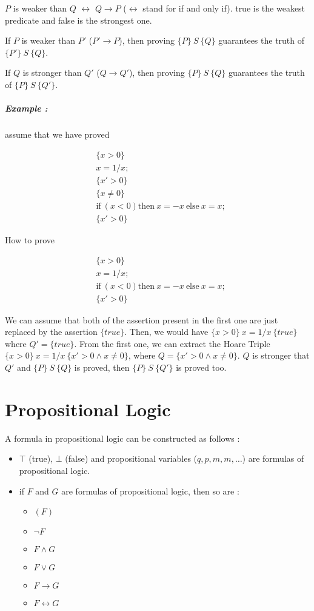 \documentclass[a4paper,11pt]{report}
\newcommand{\HTriple}[3]{\{#1\}\ #2 \ \{#3\}}
\begin{document}
$P$ is weaker than $Q$ $\leftrightarrow$ $Q \to P$ ($\leftrightarrow$ stand for
if and only if). true is the weakest predicate and false is the strongest one.

If $P$ is weaker than $P'$ ($P' \to P$), then proving $\HTriple{P}{S}{Q}$
guarantees the truth of $\HTriple{P'}{S}{Q}$.

If $Q$ is stronger than $Q'$ ($Q \to Q'$), then proving $\HTriple{P}{S}{Q}$
guarantees the truth of $\HTriple{P}{S}{Q'}$.

\paragraph{Example :} assume that we have proved

\begin{align*}
  & \{ x > 0 \} \\
  & x = 1/x; \\
  & \{ x' > 0 \} \\
  & \{ x \neq 0\} \\
  & \text{if}\ (x<0) \text{then}\ x = -x\ \text{else}\ x = x; \\
  & \{ x' > 0 \}
\end{align*}

How to prove

\begin{align*}
  & \{ x > 0 \} \\
  & x = 1/x; \\
  & \text{if}\ (x<0) \text{then}\ x = -x\ \text{else}\ x = x; \\
  & \{ x' > 0 \}
\end{align*}

We can assume that both of the assertion present in the first one are just
replaced by the assertion $\{true\}$. Then, we would have
$\HTriple{x>0}{x=1/x}{true}$ where $Q' = \{true\}$. From the first one, we can
extract the Hoare Triple $\HTriple{x>0}{x=1/x}{x'>0 \wedge x\neq 0}$, where $Q =
\{x'>0 \wedge x\neq 0\}$. $Q$ is stronger that $Q'$ and $\HTriple{P}{S}{Q}$ is
proved, then $\HTriple{P}{S}{Q'}$ is proved too.

\chapter{Propositional Logic}

A formula in propositional logic can be constructed as follows :
\begin{itemize}
\item $\top$ (true), $\bot$ (false) and propositional variables
  ($q,p,m,m,\dots$) are formulas of propositional logic.
\item if $F$ and $G$ are formulas of propositional logic, then so are :
  \begin{itemize}
  \item $(F)$
  \item $\neg F$
  \item $F \wedge G$
  \item $F \vee G$
  \item $F \to G$
  \item $F \leftrightarrow G$
  \end{itemize}
\end{itemize}
\end{document}
